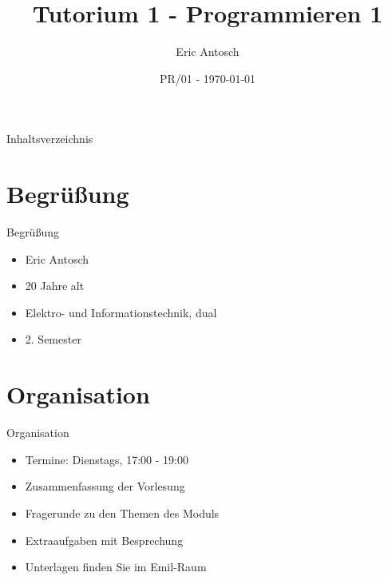 \documentclass[usenames,dvipsnames,10pt]{beamer}
\title{Tutorium 1 - Programmieren 1}
\date[ISPN ’80]{PR/01 - \today}
\author{Eric Antosch}
\begin{document}
    
    \begin{frame}
        \titlepage
    \end{frame}    
    \begin{frame}{Inhaltsverzeichnis}
        \tableofcontents
    \end{frame}
    \section{Begrüßung}
    \begin{frame}{Begrüßung}
        \begin{itemize}
            \item Eric Antosch
            \pause
            \item 20 Jahre alt
            \pause 
            \item Elektro- und Informationstechnik, dual
            \pause
            \item 2. Semester
        \end{itemize}
    \end{frame}
    \section{Organisation}
    \begin{frame}{Organisation}
        \begin{itemize}
            \item Termine: Dienstags, 17:00 - 19:00
            \item Zusammenfassung der Vorlesung
            \item Fragerunde zu den Themen des Moduls
            \item Extraaufgaben mit Besprechung
            \item Unterlagen finden Sie im Emil-Raum
        \end{itemize}
    \end{frame}
\end{document}

